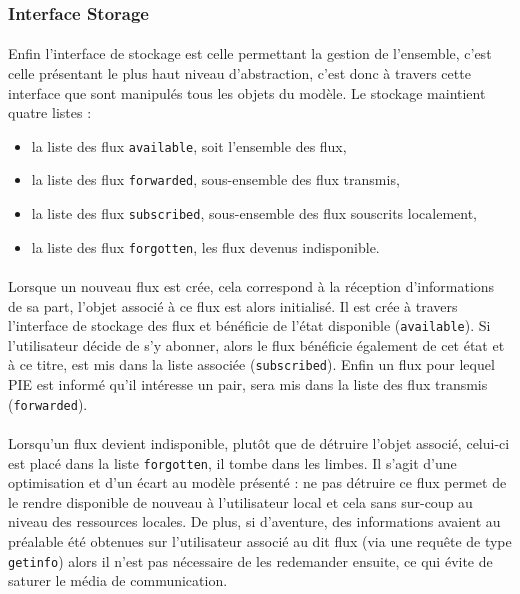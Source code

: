 \subsubsection{Interface Storage}

\paragraph{}

Enfin l'interface de stockage est celle permettant la gestion de l'ensemble, c'est 
celle présentant le plus haut niveau d'abstraction, c'est donc à travers cette interface
que sont manipulés tous les objets du modèle. Le stockage maintient quatre listes :

\begin{itemize}
	\item la liste des flux \texttt{available}, soit l'ensemble des flux,
	\item la liste des flux \texttt{forwarded}, sous-ensemble des flux transmis,
	\item la liste des flux \texttt{subscribed}, sous-ensemble des flux souscrits localement,
	\item la liste des flux \texttt{forgotten}, les flux devenus indisponible.
\end{itemize}


\paragraph{}

Lorsque un nouveau flux est crée, cela correspond à la réception d'informations de sa part, l'objet
associé à ce flux est alors initialisé. Il est crée à travers l'interface de stockage des flux et
bénéficie de l'état disponible (\texttt{available}). Si l'utilisateur décide de s'y abonner, alors
le flux bénéficie également de cet état et à ce titre, est mis dans la liste associée (\texttt{subscribed}).
Enfin un flux pour lequel PIE est informé qu'il intéresse un pair, sera mis dans la liste des flux
transmis (\texttt{forwarded}).


\paragraph{}

Lorsqu'un flux devient indisponible, plutôt que de détruire l'objet associé, celui-ci est placé dans la
liste \texttt{forgotten}, il tombe dans les limbes. Il s'agit d'une optimisation et d'un écart au modèle
présenté : ne pas détruire ce flux permet de le rendre disponible de nouveau à l'utilisateur local et
cela sans sur-coup au niveau des ressources locales. De plus, si d'aventure, des informations avaient
au préalable été obtenues sur l'utilisateur associé au dit flux (via une requête de type \texttt{getinfo}) alors
il n'est pas nécessaire de les redemander ensuite, ce qui évite de saturer le média de communication.


